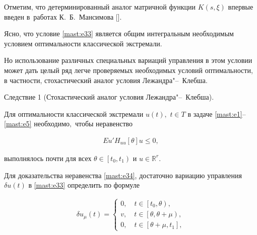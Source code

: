  \smallskip



Отметим, что детерминированный аналог матричной функции $ K(s,\xi) $ впервые введен в~работах К.~Б.~Мансимова [].



Ясно, что условие \eqref{mast:e33}   является общим интегральным необходимым условием оптимальности  классической экстремали. 

Но использование различных специальных вариаций управления  в этом условии  может дать целый ряд  легче проверяемых необходимых условий оптимальности, в частности, стохастический аналог условия Лежандра"--~Клебша. 



\smallskip



{\small \sc Следствие 1 (Стохастический аналог условия Лежандра"--~Клебша).} \it 

 Для оптимальности классической экстремали $ u(t) ,$ $ t\in T $   в задаче \eqref{mast:e1}--\eqref{mast:e5} необходимо$,$ чтобы неравенство 

\begin{gather}

   \label{mast:e34}

 E u' H_{uu}[\theta] u \leq 0,   

 \end{gather}

выполнялось почти для всех $ \theta \in \left[ t_{0}, t_{1} \right)  $  и  $ u\in  \mathbb R^{r} .$ 



\rm



\smallskip



Для доказательства неравенства \eqref{mast:e34}, достаточно  вариацию управления $ \delta u(t) $  в \eqref{mast:e33} определить по формуле

\begin{gather}

   \label{mast:e35}

\delta u_{\mu}(t)=

\begin{cases}

0,  \quad t\in \left[ t_{0}, \theta \right) ,\\

v, \quad t\in \left[ \theta, \theta +\mu \right) ,\\

0, \quad t\in \left[ \theta +\mu, t_{1} \right], 

\end{cases}

 \end{gather}

